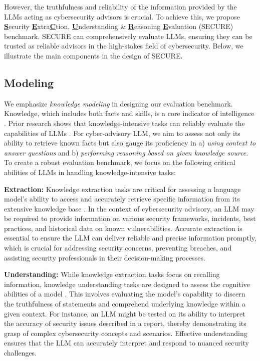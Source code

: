\documentclass[conference]{IEEEtran}
\begin{document}
However, the truthfulness and reliability of the information provided by the LLMs acting as cybersecurity advisors is crucial. To achieve this, we propose \underline{\textbf{S}}ecurity \underline{\textbf{E}}xtra\underline{\textbf{C}}tion, \underline{\textbf{U}}nderstanding \& \underline{\textbf{R}}easoning \underline{\textbf{E}}valuation (SECURE) benchmark. SECURE can comprehensively evaluate LLMs, ensuring they can be trusted as reliable advisors in the high-stakes field of cybersecurity. Below, we illustrate the main components in the design of SECURE.

\subsection{Modeling}\label{sec:modeling}

We emphasize \textit{knowledge modeling} in designing our evaluation benchmark. Knowledge, which includes both facts and skills, is a core indicator of intelligence \cite{feigenbaum1977art}. Prior research shows that knowledge-intensive tasks can reliably evaluate the capabilities of LLMs \cite{yu2023kola, petroni2019language}. For cyber-advisory LLM, we aim to assess not only its ability to retrieve known facts but also gauge its proficiency in a) \textit{using context to answer questions} and b) \textit{performing reasoning based on given knowledge source}. To create a robust evaluation benchmark, we focus on the following critical abilities of LLMs in handling knowledge-intensive tasks:

\textbf{Extraction:} Knowledge extraction tasks are critical for assessing a language model's ability to access and accurately retrieve specific information from its extensive knowledge base \cite{petroni2019language}. In the context of cybersecurity advisory, an LLM may be required to provide information on various security frameworks, incidents, best practices, and historical data on known vulnerabilities. Accurate extraction is essential to ensure the LLM can deliver reliable and precise information promptly, which is crucial for addressing security concerns, preventing breaches, and assisting security professionals in their decision-making processes.

\textbf{Understanding:} While knowledge extraction tasks focus on recalling information, knowledge understanding tasks are designed to assess the cognitive abilities of a model \cite{collins2014knowledge}. This involves evaluating the model's capability to discern the truthfulness of statements and comprehend underlying knowledge within a given context. For instance, an LLM might be tested on its ability to interpret the accuracy of security issues described in a report, thereby demonstrating its grasp of complex cybersecurity concepts and scenarios. Effective understanding ensures that the LLM can accurately interpret and respond to nuanced security challenges.
\end{document}
